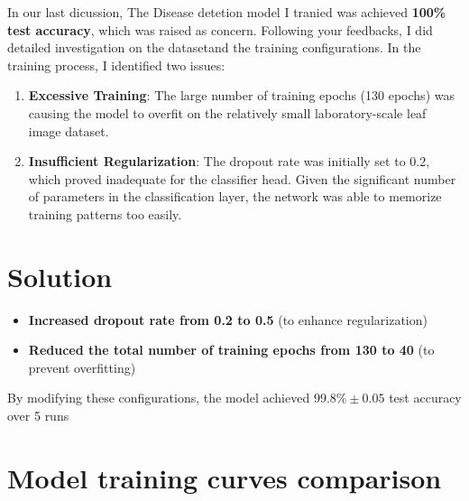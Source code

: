 \documentclass[11pt,a4paper]{article}
\begin{document}
In our last dicussion, The Disease detetion model I tranied was achieved \textbf{100\% test accuracy}, which was raised as concern. Following your feedbacks, I did detailed investigation on the datasetand the training configurations. In the training process, I identified two issues:
\begin{enumerate}
    \item \textbf{Excessive Training}: The large number of training epochs (130 epochs) was causing the model to overfit on the relatively small laboratory-scale leaf image dataset.
    
    \item \textbf{Insufficient Regularization}: The dropout rate was initially set to 0.2, which proved inadequate for the classifier head. Given the significant number of parameters in the classification layer, the network was able to memorize training patterns too easily.
\end{enumerate}

\section*{Solution}

\begin{itemize}
    \item \textbf{Increased dropout rate from 0.2 to 0.5} (to enhance regularization)
    \item \textbf{Reduced the total number of training epochs from 130 to 40} (to prevent overfitting)
\end{itemize}

By modifying these configurations, the model achieved \textbf{$99.8\%\pm0.05$} test accuracy over 5 runs

\section*{Model training curves comparison}
\end{document}
